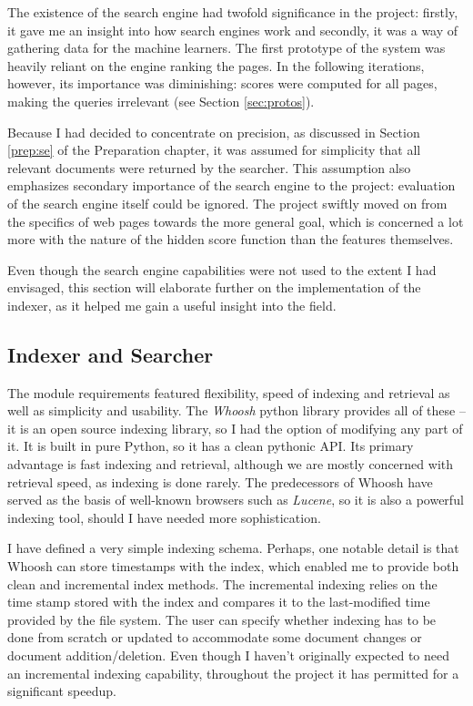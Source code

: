 \documentclass[12pt,notitlepage,twoside]{scrreprt}
\begin{document}
The existence of the search engine had twofold significance in the project: firstly, it
gave me an insight into how search engines work and secondly, it was a way of gathering
data for the machine learners. The first prototype of the system was heavily reliant on
the engine ranking the pages. In the following iterations, however, its importance was
diminishing: scores were computed for all pages, making the queries irrelevant (see
Section \ref{sec:protos}). 

Because I had decided to concentrate on precision, as discussed in Section \ref{prep:se}
of the Preparation chapter, it was assumed for simplicity that all relevant documents were
returned by the searcher. This assumption also emphasizes secondary importance of the
search engine to the project: evaluation of the search engine itself could be ignored. The
project swiftly moved on from the specifics of web pages towards the more general goal,
which is concerned a lot more with the nature of the hidden score function than the
features themselves.

Even though the search engine capabilities were not used to the extent I had envisaged,
this section will elaborate further on the implementation of the indexer, as it helped me
gain a useful insight into the field.

\subsection{Indexer and Searcher}

The module requirements featured flexibility, speed of indexing and retrieval as well as
simplicity and usability.  The \textit{Whoosh} python library provides all of these -- it
is  an open source indexing library, so I had the option of modifying any part of it.  It
is  built in pure Python, so it has a clean pythonic API. Its primary advantage is fast
indexing and retrieval, although we are mostly concerned with retrieval speed, as indexing
is done rarely. The predecessors of Whoosh have served as the basis of well-known browsers
such as \textit{Lucene}, so it is also a powerful indexing tool, should I have needed more
sophistication.

I have defined a very simple indexing schema. Perhaps, one notable detail is that Whoosh
can store timestamps with the index, which enabled me to provide both clean and
incremental index methods. The incremental indexing relies on the time stamp stored with
the index and compares it to the last-modified time provided by the file system. The user
can specify whether indexing has to be done from scratch or updated to accommodate some
document changes or document addition/deletion. Even though I haven't originally expected
to need an incremental indexing capability, throughout the project it has permitted for a
significant speedup.
\end{document}
